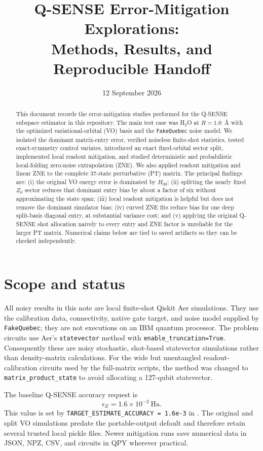 \documentclass[11pt]{article}
\title{Q-SENSE Error-Mitigation Explorations:\\Methods, Results, and Reproducible Handoff}
\author{}
\date{12 September 2026}
\newcommand{\code}[1]{\texttt{#1}}
\begin{document}
\maketitle

\begin{abstract}
This document records the error-mitigation studies performed for the Q-SENSE
subspace estimator in this repository.  The main test case was H$_2$O at
$R=1.0$~\AA{} with the optimized variational-orbital (VO) basis and the
\code{FakeQuebec} noise model.  We isolated the dominant matrix-entry error,
verified noiseless finite-shot statistics, tested exact-symmetry control
variates, introduced an exact fixed-orbital sector split, implemented local
readout mitigation, and studied deterministic and probabilistic local-folding
zero-noise extrapolation (ZNE).  We also applied readout mitigation and linear
ZNE to the complete 37-state perturbative (PT) matrix.  The principal findings
are: (i) the original VO energy error is dominated by $H_{00}$; (ii) splitting
the nearly fixed $Z_0$ sector reduces that dominant entry bias by about a factor
of six without approximating the state span; (iii) local readout mitigation is
helpful but does not remove the dominant simulator bias; (iv) curved ZNE fits
reduce bias for one deep split-basis diagonal entry, at substantial variance
cost; and (v) applying the original Q-SENSE shot allocation naively to every
entry and ZNE factor is unreliable for the larger PT matrix.  Numerical claims
below are tied to saved artifacts so they can be checked independently.
\end{abstract}

\section{Scope and status}

All noisy results in this note are local finite-shot Qiskit Aer simulations.
They use the calibration data, connectivity, native gate target, and noise
model supplied by \code{FakeQuebec}; they are not executions on an IBM quantum
processor.  The problem circuits use Aer's \code{statevector} method with
\code{enable\_truncation=True}.  Consequently these are noisy stochastic,
shot-based statevector simulations rather than density-matrix calculations.
For the wide but unentangled readout-calibration circuits used by the
full-matrix scripts, the method was changed to
\code{matrix\_product\_state} to avoid allocating a 127-qubit statevector.

The baseline Q-SENSE accuracy request is
\[
  \epsilon_E=1.6\times10^{-3}\ \mathrm{Ha}.
\]
This value is set by \code{TARGET\_ESTIMATE\_ACCURACY = 1.6e-3} in
.  The original and split VO simulations
predate the portable-output default and therefore retain several trusted local
pickle files.  Newer mitigation runs save numerical data in JSON, NPZ, CSV,
and circuits in QPY wherever practical.
\end{document}
